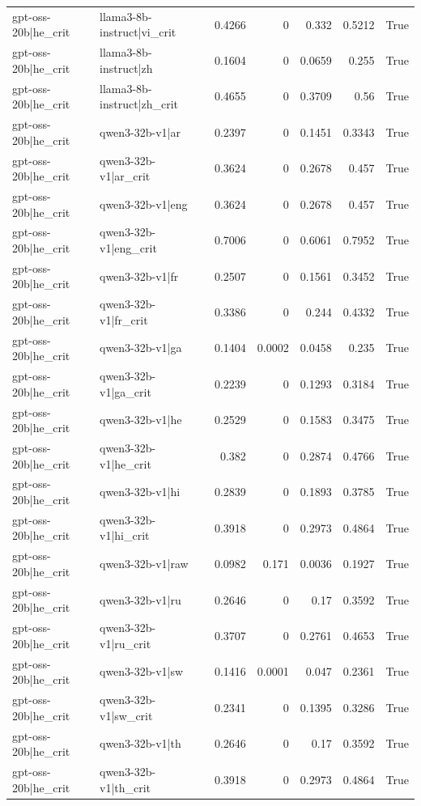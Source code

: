 \begin{table}
\begin{tabular}{l l r r r r l}
gpt-oss-20b|he_crit & llama3-8b-instruct|vi_crit & 0.4266 & 0 & 0.332 & 0.5212 & True \\
gpt-oss-20b|he_crit & llama3-8b-instruct|zh & 0.1604 & 0 & 0.0659 & 0.255 & True \\
gpt-oss-20b|he_crit & llama3-8b-instruct|zh_crit & 0.4655 & 0 & 0.3709 & 0.56 & True \\
gpt-oss-20b|he_crit & qwen3-32b-v1|ar & 0.2397 & 0 & 0.1451 & 0.3343 & True \\
gpt-oss-20b|he_crit & qwen3-32b-v1|ar_crit & 0.3624 & 0 & 0.2678 & 0.457 & True \\
gpt-oss-20b|he_crit & qwen3-32b-v1|eng & 0.3624 & 0 & 0.2678 & 0.457 & True \\
gpt-oss-20b|he_crit & qwen3-32b-v1|eng_crit & 0.7006 & 0 & 0.6061 & 0.7952 & True \\
gpt-oss-20b|he_crit & qwen3-32b-v1|fr & 0.2507 & 0 & 0.1561 & 0.3452 & True \\
gpt-oss-20b|he_crit & qwen3-32b-v1|fr_crit & 0.3386 & 0 & 0.244 & 0.4332 & True \\
gpt-oss-20b|he_crit & qwen3-32b-v1|ga & 0.1404 & 0.0002 & 0.0458 & 0.235 & True \\
gpt-oss-20b|he_crit & qwen3-32b-v1|ga_crit & 0.2239 & 0 & 0.1293 & 0.3184 & True \\
gpt-oss-20b|he_crit & qwen3-32b-v1|he & 0.2529 & 0 & 0.1583 & 0.3475 & True \\
gpt-oss-20b|he_crit & qwen3-32b-v1|he_crit & 0.382 & 0 & 0.2874 & 0.4766 & True \\
gpt-oss-20b|he_crit & qwen3-32b-v1|hi & 0.2839 & 0 & 0.1893 & 0.3785 & True \\
gpt-oss-20b|he_crit & qwen3-32b-v1|hi_crit & 0.3918 & 0 & 0.2973 & 0.4864 & True \\
gpt-oss-20b|he_crit & qwen3-32b-v1|raw & 0.0982 & 0.171 & 0.0036 & 0.1927 & True \\
gpt-oss-20b|he_crit & qwen3-32b-v1|ru & 0.2646 & 0 & 0.17 & 0.3592 & True \\
gpt-oss-20b|he_crit & qwen3-32b-v1|ru_crit & 0.3707 & 0 & 0.2761 & 0.4653 & True \\
gpt-oss-20b|he_crit & qwen3-32b-v1|sw & 0.1416 & 0.0001 & 0.047 & 0.2361 & True \\
gpt-oss-20b|he_crit & qwen3-32b-v1|sw_crit & 0.2341 & 0 & 0.1395 & 0.3286 & True \\
gpt-oss-20b|he_crit & qwen3-32b-v1|th & 0.2646 & 0 & 0.17 & 0.3592 & True \\
gpt-oss-20b|he_crit & qwen3-32b-v1|th_crit & 0.3918 & 0 & 0.2973 & 0.4864 & True \\

\end{tabular}
\end{table}
